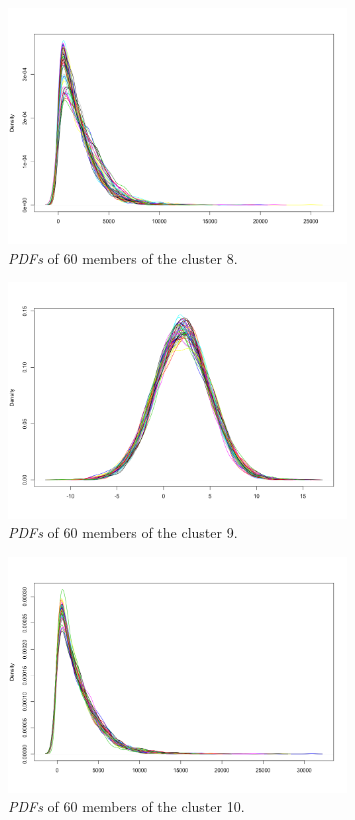 \begin{figure}[H]
    \centering
    \includegraphics[width=0.8\textwidth]{images/cluster8.png}
    \caption{\textit{PDFs} of 60 members of the cluster 8.}
    \label{fig:cluster8}
\end{figure}

\begin{figure}[H]
    \centering
    \includegraphics[width=0.8\textwidth]{images/cluster9.png}
    \caption{\textit{PDFs} of 60 members of the cluster 9.}
    \label{fig:cluster9}
\end{figure}

\begin{figure}[H]
    \centering
    \includegraphics[width=0.8\textwidth]{images/Cluster10.png}
    \caption{\textit{PDFs} of 60 members of the cluster 10.}
    \label{fig:cluster10}
\end{figure}

